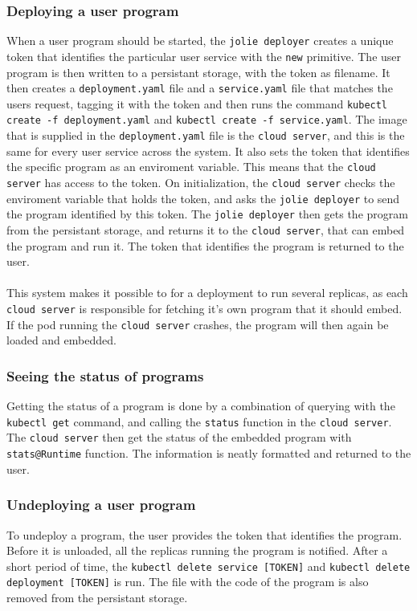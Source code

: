 \documentclass[Report.tex]{subfiles}
\begin{document}
\subsubsection{Deploying a user program}
When a user program should be started, the {\tt jolie deployer} creates a unique token that identifies the particular user service with the {\tt new} primitive. The user program is then written to a persistant storage, with the token as filename. It then creates a {\tt deployment.yaml} file and a {\tt service.yaml} file that matches the users request, tagging it with the token and then runs the command {\tt kubectl create -f deployment.yaml} and {\tt kubectl create -f service.yaml}. The image that is supplied in the {\tt deployment.yaml} file is the {\tt cloud server}, and this is the same for every user service across the system. It also sets the token that identifies the specific program as an enviroment variable. This means that the {\tt cloud server} has access to the token. On initialization, the {\tt cloud server} checks the enviroment variable that holds the token, and asks the {\tt jolie deployer} to send the program identified by this token. The {\tt jolie deployer} then gets the program from the persistant storage, and returns it to the {\tt cloud server}, that can embed the program and run it. The token that identifies the program is returned to the user.
\\\\
This system makes it possible to for a deployment to run several replicas, as each {\tt cloud server} is responsible for fetching it's own program that it should embed. If the pod running the {\tt cloud server} crashes, the program will then again be loaded and embedded.
\subsubsection{Seeing the status of programs}
Getting the status of a program is done by a combination of querying with the {\tt kubectl get} command, and calling the {\tt status} function in the {\tt cloud server}. The {\tt cloud server} then get the status of the embedded program with {\tt stats@Runtime} function. The information is neatly formatted and returned to the user.
\subsubsection{Undeploying a user program}
To undeploy a program, the user provides the token that identifies the program. Before it is unloaded, all the replicas running the program is notified. After a short period of time, the {\tt kubectl delete service [TOKEN]} and {\tt kubectl delete deployment [TOKEN]} is run. The file with the code of the program is also removed from the persistant storage.
\end{document}
